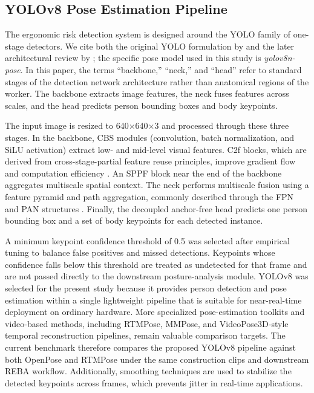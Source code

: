 \documentclass[11pt]{article}
\begin{document}
\subsection{YOLOv8 Pose Estimation Pipeline}

The ergonomic risk detection system is designed around the YOLO family of one-stage detectors. We cite both the original YOLO formulation by \citet{redmon2016yolo} and the later architectural review by \citet{terven2023comprehensive}; the specific pose model used in this study is \textit{yolov8n-pose}. In this paper, the terms ``backbone,'' ``neck,'' and ``head'' refer to standard stages of the detection network architecture rather than anatomical regions of the worker. The backbone extracts image features, the neck fuses features across scales, and the head predicts person bounding boxes and body keypoints.

The input image is resized to 640×640×3 and processed through these three stages. In the backbone, CBS modules (convolution, batch normalization, and SiLU activation) extract low- and mid-level visual features. C2f blocks, which are derived from cross-stage-partial feature reuse principles, improve gradient flow and computation efficiency \citep{wang2020cspnet}. An SPPF block near the end of the backbone aggregates multiscale spatial context. The neck performs multiscale fusion using a feature pyramid and path aggregation, commonly described through the FPN and PAN structures \citep{lin2017fpn,liu2018panet}. Finally, the decoupled anchor-free head predicts one person bounding box and a set of body keypoints for each detected instance.

A minimum keypoint confidence threshold of  0.5   was selected after empirical tuning to balance false positives and missed detections. Keypoints whose confidence falls below this threshold are treated as undetected for that frame and are not passed directly to the downstream posture-analysis module.
YOLOv8 was selected for the present study because it provides person detection and pose estimation within a single lightweight pipeline that is suitable for near-real-time deployment on ordinary hardware. More specialized pose-estimation toolkits and video-based methods, including RTMPose, MMPose, and VideoPose3D-style temporal reconstruction pipelines, remain valuable comparison targets. The current benchmark therefore compares the proposed YOLOv8 pipeline against both OpenPose and RTMPose under the same construction clips and downstream REBA workflow.
Additionally, smoothing techniques are used to stabilize the detected keypoints across frames, which prevents jitter in real-time applications.
\end{document}
